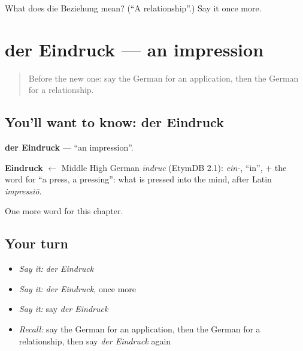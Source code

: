 \begin{tcolorbox}[breakable,colback=teal!4,colframe=teal!35!black,title={Before you move on}]
What does die Beziehung mean? (\textquotedblleft{}A relationship\textquotedblright{}.) Say it once more.
\end{tcolorbox}
\section[der Eindruck]{der Eindruck — an impression}

\label{lesson:GE-C227-eindruck}



\begin{quote}
Before the new one: say the German for an application, then the German for a relationship.
\end{quote}

\subsection*{You'll want to know: der Eindruck}
\textbf{der Eindruck} — \textquotedblleft{}an impression\textquotedblright{}.

\begin{cousinweb}
\textbf{Eindruck} $\leftarrow$ Middle High German \emph{īndruc} (EtymDB 2.1): \emph{ein-}, \textquotedblleft{}in\textquotedblright{}, + the word for \textquotedblleft{}a press, a pressing\textquotedblright{}: what is pressed into the mind, after Latin \emph{impressiō}.
\end{cousinweb}

\begin{grammarlens}[title={What you've built}]
One more word for this chapter.
\end{grammarlens}

\subsection*{Your turn}
\begin{itemize}
\raggedright
  \item \emph{Say it:} \emph{der Eindruck}
  \item \emph{Say it:} \emph{der Eindruck}, once more
  \item \emph{Say it:} say \emph{der Eindruck}
  \item \emph{Recall:} say the German for an application, then the German for a relationship, then say \emph{der Eindruck} again
\end{itemize}

